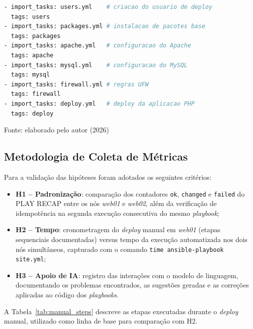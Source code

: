 \documentclass[12pt]{article}
\newenvironment{quadro}[1][H]
  {\begin{table}[#1]\centering}
  {\end{table}}
\newcommand{\fonte}[1]{%
  \begin{flushleft}
    \footnotesize Fonte: #1
  \end{flushleft}%
}
\begin{document}
\begin{quadro}[H]
  \caption{Organização de tarefas da \textit{role} LAMP -- \texttt{tasks/main.yml}}
  \label{quad:rolemainyml}
  \begin{lstlisting}[language=bash]
- import_tasks: users.yml    # criacao do usuario de deploy
  tags: users
- import_tasks: packages.yml # instalacao de pacotes base
  tags: packages
- import_tasks: apache.yml   # configuracao do Apache
  tags: apache
- import_tasks: mysql.yml    # configuracao do MySQL
  tags: mysql
- import_tasks: firewall.yml # regras UFW
  tags: firewall
- import_tasks: deploy.yml   # deploy da aplicacao PHP
  tags: deploy
  \end{lstlisting}
  \fonte{elaborado pelo autor (2026)}
\end{quadro}

\subsection{Metodologia de Coleta de Métricas}

Para a validação das hipóteses foram adotados os seguintes critérios:

\begin{itemize}
  \item \textbf{H1 -- Padronização}: comparação dos contadores \texttt{ok},
        \texttt{changed} e \texttt{failed} do PLAY RECAP entre os nós
        \textit{web01} e \textit{web02}, além da verificação de idempotência
        na segunda execução consecutiva do mesmo \textit{playbook};

  \item \textbf{H2 -- Tempo}: cronometragem do \textit{deploy} manual em
        \textit{web01} (etapas sequenciais documentadas) versus tempo da
        execução automatizada nos dois nós simultâneos, capturado com o
        comando \texttt{time ansible-playbook site.yml};

  \item \textbf{H3 -- Apoio de IA}: registro das interações com o modelo
        de linguagem, documentando os problemas encontrados, as sugestões
        geradas e as correções aplicadas ao código dos \textit{playbooks}.
\end{itemize}

A Tabela~\ref{tab:manual_steps} descreve as etapas executadas durante o
\textit{deploy} manual, utilizado como linha de base para comparação com
H2.
\end{document}
